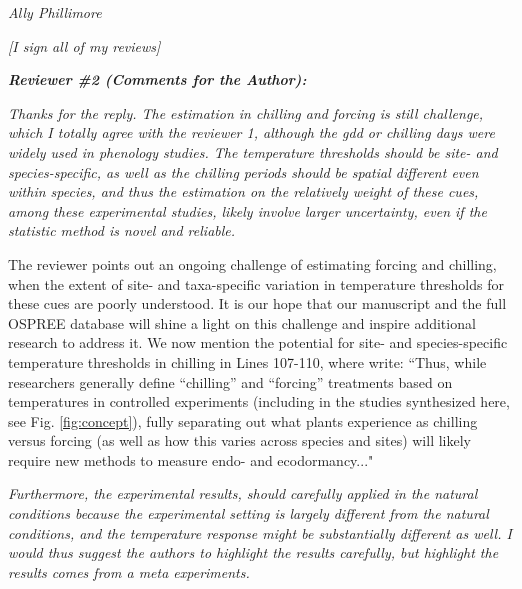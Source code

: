 \documentclass{article}
\begin{document}
\par \emph{Ally Phillimore}
\par \emph{[I sign all of my reviews]}


\par \emph{\bf{Reviewer \#2 (Comments for the Author):}}\\

\par \emph{Thanks for the reply. The estimation in chilling and forcing is still challenge, which I totally agree with the reviewer 1, although the gdd or chilling days were widely used in phenology studies. The temperature thresholds should be site- and species-specific, as well as the chilling periods should be spatial different even within species, and thus the estimation on the relatively weight of these cues, among these experimental studies, likely involve larger uncertainty, even if the statistic method is novel and reliable.}
\par The reviewer points out an ongoing challenge of estimating forcing and chilling, when the extent of site- and taxa-specific variation in temperature thresholds for these cues are poorly understood. It is our hope that our manuscript and the full OSPREE database will shine a light on this challenge and inspire additional research to address it. We now mention the potential for site- and species-specific temperature thresholds in chilling in Lines 107-110, where write:
``Thus, while researchers generally define ``chilling'' and ``forcing'' treatments based on temperatures in controlled experiments (including in the studies synthesized here, see Fig. \ref{fig:concept}), fully separating out what plants experience as chilling versus forcing (as well as how this varies across species and sites) will likely require new methods to measure endo- and ecodormancy..."
\par \emph{Furthermore, the experimental results, should carefully applied in the natural conditions because the experimental setting is largely different from the natural conditions, and the temperature response might be substantially different as well. I would thus suggest the authors to highlight the results carefully, but highlight the results comes from a meta experiments.}
\end{document}
